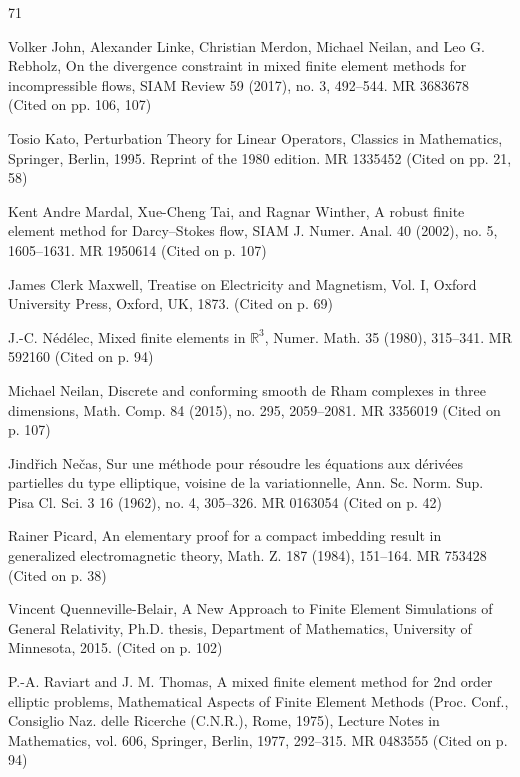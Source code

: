 \begin{MBSourceBibliography}{71}
\item\label{bib:source-55}Volker John, Alexander Linke, Christian Merdon, Michael Neilan, and Leo G. Rebholz, On the divergence constraint in mixed finite element methods for incompressible flows, SIAM Review 59 (2017), no. 3, 492–544. MR 3683678 (Cited on pp. 106, 107)

\item\label{bib:source-56}Tosio Kato, Perturbation Theory for Linear Operators, \newline Classics in Mathematics, Springer, Berlin, 1995. Reprint of the 1980 edition. MR 1335452 (Cited on pp. 21, 58)

\item\label{bib:source-57}Kent Andre Mardal, Xue-Cheng Tai, and Ragnar Winther, A robust finite element method for Darcy–Stokes flow, SIAM J. Numer. Anal. 40 (2002), no. 5, 1605–1631. MR 1950614 (Cited on p. 107)

\item\label{bib:source-58}James Clerk Maxwell, Treatise on Electricity and Magnetism, Vol. I, Oxford University Press, Oxford, UK, 1873. (Cited on p. 69)

\item\label{bib:source-59}J.-C. Nédélec, Mixed finite elements in $\mathbb R^3$, Numer. Math. 35 (1980), 315–341. MR 592160 (Cited on p. 94)

\item\label{bib:source-60}Michael Neilan, Discrete and conforming smooth de Rham complexes in three dimensions, Math. Comp. 84 (2015), no. 295, 2059–2081. MR 3356019 (Cited on p. 107)

\item\label{bib:source-61}Jindřich Nečas, Sur une méthode pour résoudre les équations aux dérivées partielles du type elliptique, voisine de la variationnelle, Ann. Sc. Norm. Sup. Pisa Cl. Sci. 3 16 (1962), no. 4, 305–326. MR 0163054 (Cited on p. 42)

\item\label{bib:source-62}Rainer Picard, An elementary proof for a compact imbedding result in generalized electromagnetic theory, Math. Z. 187 (1984), 151–164. MR 753428 (Cited on p. 38)

\item\label{bib:source-63}Vincent Quenneville-Belair, A New Approach to Finite Element Simulations of General Relativity, Ph.D. thesis, Department of Mathematics, University of Minnesota, 2015. (Cited on p. 102)

\item\label{bib:source-64}P.-A. Raviart and J. M. Thomas, A mixed finite element method for 2nd order elliptic problems, Mathematical Aspects of Finite Element Methods (Proc. Conf., Consiglio Naz. delle Ricerche (C.N.R.), Rome, 1975), Lecture Notes in Mathematics, vol. 606, Springer, Berlin, 1977, 292–315. MR 0483555 (Cited on p. 94)


\end{MBSourceBibliography}
